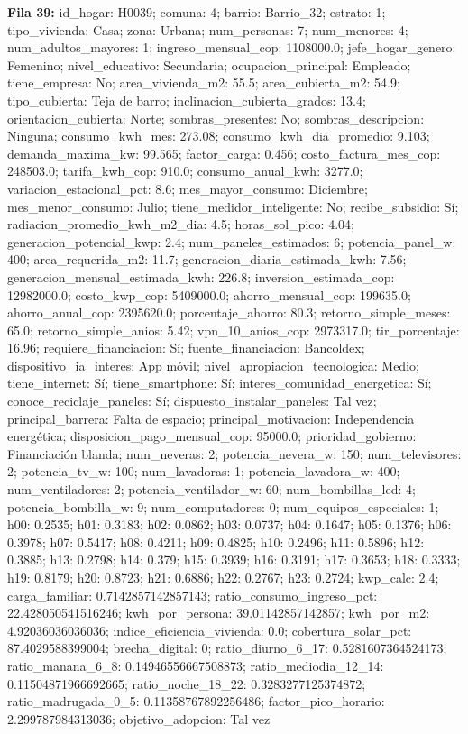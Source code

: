 {\footnotesize\textbf{Fila 39:} id\_hogar: H0039; comuna: 4; barrio: Barrio\_32; estrato: 1; tipo\_vivienda: Casa; zona: Urbana; num\_personas: 7; num\_menores: 4; num\_adultos\_mayores: 1; ingreso\_mensual\_cop: 1108000.0; jefe\_hogar\_genero: Femenino; nivel\_educativo: Secundaria; ocupacion\_principal: Empleado; tiene\_empresa: No; area\_vivienda\_m2: 55.5; area\_cubierta\_m2: 54.9; tipo\_cubierta: Teja de barro; inclinacion\_cubierta\_grados: 13.4; orientacion\_cubierta: Norte; sombras\_presentes: No; sombras\_descripcion: Ninguna; consumo\_kwh\_mes: 273.08; consumo\_kwh\_dia\_promedio: 9.103; demanda\_maxima\_kw: 99.565; factor\_carga: 0.456; costo\_factura\_mes\_cop: 248503.0; tarifa\_kwh\_cop: 910.0; consumo\_anual\_kwh: 3277.0; variacion\_estacional\_pct: 8.6; mes\_mayor\_consumo: Diciembre; mes\_menor\_consumo: Julio; tiene\_medidor\_inteligente: No; recibe\_subsidio: Sí; radiacion\_promedio\_kwh\_m2\_dia: 4.5; horas\_sol\_pico: 4.04; generacion\_potencial\_kwp: 2.4; num\_paneles\_estimados: 6; potencia\_panel\_w: 400; area\_requerida\_m2: 11.7; generacion\_diaria\_estimada\_kwh: 7.56; generacion\_mensual\_estimada\_kwh: 226.8; inversion\_estimada\_cop: 12982000.0; costo\_kwp\_cop: 5409000.0; ahorro\_mensual\_cop: 199635.0; ahorro\_anual\_cop: 2395620.0; porcentaje\_ahorro: 80.3; retorno\_simple\_meses: 65.0; retorno\_simple\_anios: 5.42; vpn\_10\_anios\_cop: 2973317.0; tir\_porcentaje: 16.96; requiere\_financiacion: Sí; fuente\_financiacion: Bancoldex; dispositivo\_ia\_interes: App móvil; nivel\_apropiacion\_tecnologica: Medio; tiene\_internet: Sí; tiene\_smartphone: Sí; interes\_comunidad\_energetica: Sí; conoce\_reciclaje\_paneles: Sí; dispuesto\_instalar\_paneles: Tal vez; principal\_barrera: Falta de espacio; principal\_motivacion: Independencia energética; disposicion\_pago\_mensual\_cop: 95000.0; prioridad\_gobierno: Financiación blanda; num\_neveras: 2; potencia\_nevera\_w: 150; num\_televisores: 2; potencia\_tv\_w: 100; num\_lavadoras: 1; potencia\_lavadora\_w: 400; num\_ventiladores: 2; potencia\_ventilador\_w: 60; num\_bombillas\_led: 4; potencia\_bombilla\_w: 9; num\_computadores: 0; num\_equipos\_especiales: 1; h00: 0.2535; h01: 0.3183; h02: 0.0862; h03: 0.0737; h04: 0.1647; h05: 0.1376; h06: 0.3978; h07: 0.5417; h08: 0.4211; h09: 0.4825; h10: 0.2496; h11: 0.5896; h12: 0.3885; h13: 0.2798; h14: 0.379; h15: 0.3939; h16: 0.3191; h17: 0.3653; h18: 0.3333; h19: 0.8179; h20: 0.8723; h21: 0.6886; h22: 0.2767; h23: 0.2724; kwp\_calc: 2.4; carga\_familiar: 0.7142857142857143; ratio\_consumo\_ingreso\_pct: 22.428050541516246; kwh\_por\_persona: 39.01142857142857; kwh\_por\_m2: 4.92036036036036; indice\_eficiencia\_vivienda: 0.0; cobertura\_solar\_pct: 87.4029588399004; brecha\_digital: 0; ratio\_diurno\_6\_17: 0.5281607364524173; ratio\_manana\_6\_8: 0.14946556667508873; ratio\_mediodia\_12\_14: 0.11504871966692665; ratio\_noche\_18\_22: 0.3283277125374872; ratio\_madrugada\_0\_5: 0.11358767892256486; factor\_pico\_horario: 2.299787984313036; objetivo\_adopcion: Tal vez\par}
